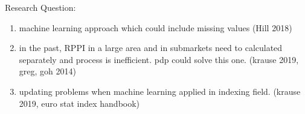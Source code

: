 Research Question:
\begin{enumerate}
\item machine learning approach which could include missing values (Hill 2018)
\item in the past, RPPI in a large area and in submarkets  need to calculated separately and process is inefficient. pdp could solve this one. (krause 2019, greg, goh 2014)
\item updating problems when machine learning applied in indexing field. (krause 2019, euro stat index handbook)
\end{enumerate}